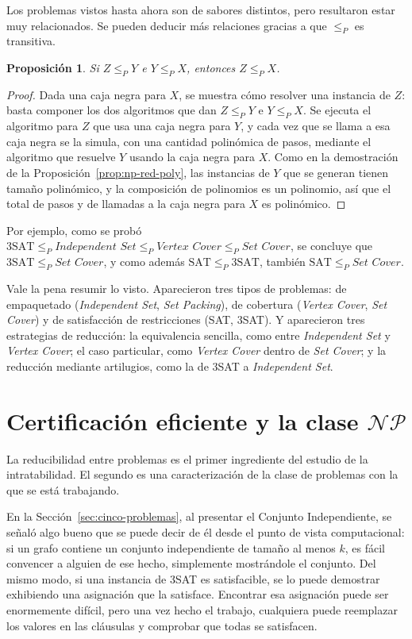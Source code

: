 \documentclass[12pt, spanish, oneside, openany]{book}
\newcommand{\NP}{\mathcal{NP}}
\newcommand{\redp}{\le_{P}}
\newcommand{\prob}[1]{\textit{#1}}
\newcommand{\IS}{\prob{Independent Set}\xspace}
\newcommand{\VC}{\prob{Vertex Cover}\xspace}
\newcommand{\SC}{\prob{Set Cover}\xspace}
\newcommand{\SP}{\prob{Set Packing}\xspace}
\theoremstyle{uprightplain}
\newtheorem{proposicion}[teorema]{Proposición}
\theoremstyle{definition}
\theoremstyle{remark}
\theoremstyle{definition}
\begin{document}
Los problemas vistos hasta ahora son de sabores distintos, pero resultaron estar muy relacionados. Se pueden deducir más relaciones gracias a que $\redp$ es transitiva.

\begin{proposicion}
\label{prop:np-transitividad}
Si $Z\redp Y$ e $Y\redp X$, entonces $Z\redp X$.
\end{proposicion}
\begin{proof}
Dada una caja negra para $X$, se muestra cómo resolver una instancia de $Z$: basta componer los dos algoritmos que dan $Z\redp Y$ e $Y\redp X$. Se ejecuta el algoritmo para $Z$ que usa una caja negra para $Y$, y cada vez que se llama a esa caja negra se la simula, con una cantidad polinómica de pasos, mediante el algoritmo que resuelve $Y$ usando la caja negra para $X$. Como en la demostración de la Proposición~\ref{prop:np-red-poly}, las instancias de $Y$ que se generan tienen tamaño polinómico, y la composición de polinomios es un polinomio, así que el total de pasos y de llamadas a la caja negra para $X$ es polinómico.
\end{proof}

Por ejemplo, como se probó $3\mathrm{SAT}\redp\IS\redp\VC\redp\SC$, se concluye que $3\mathrm{SAT}\redp\SC$, y como además $\mathrm{SAT}\redp 3\mathrm{SAT}$, también $\mathrm{SAT}\redp\SC$.

Vale la pena resumir lo visto. Aparecieron tres tipos de problemas: de empaquetado (\IS, \SP), de cobertura (\VC, \SC) y de satisfacción de restricciones (SAT, 3SAT). Y aparecieron tres estrategias de reducción: la equivalencia sencilla, como entre \IS y \VC; el caso particular, como \VC dentro de \SC; y la reducción mediante artilugios, como la de 3SAT a \IS.


\section{\texorpdfstring{Certificación eficiente y la clase $\NP$}{Certificación eficiente y la clase NP}}
\label{sec:np-certificacion}

La reducibilidad entre problemas es el primer ingrediente del estudio de la intratabilidad. El segundo es una caracterización de la clase de problemas con la que se está trabajando.

En la Sección~\ref{sec:cinco-problemas}, al presentar el Conjunto Independiente, se señaló algo bueno que se puede decir de él desde el punto de vista computacional: si un grafo contiene un conjunto independiente de tamaño al menos $k$, es fácil convencer a alguien de ese hecho, simplemente mostrándole el conjunto. Del mismo modo, si una instancia de 3SAT es satisfacible, se lo puede demostrar exhibiendo una asignación que la satisface. Encontrar esa asignación puede ser enormemente difícil, pero una vez hecho el trabajo, cualquiera puede reemplazar los valores en las cláusulas y comprobar que todas se satisfacen.
\end{document}
